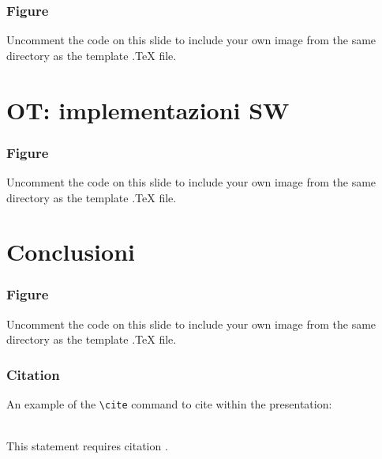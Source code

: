 \documentclass{beamer}
\begin{document}

\begin{frame}
	\frametitle{Figure}
	Uncomment the code on this slide to include your own image from the same directory as the template .TeX file.
\end{frame}

\section{OT: implementazioni SW}


\begin{frame}
	\frametitle{Figure}
	Uncomment the code on this slide to include your own image from the same directory as the template .TeX file.
\end{frame}



\section{Conclusioni}



\begin{frame}
	\frametitle{Figure}
	Uncomment the code on this slide to include your own image from the same directory as the template .TeX file.
\end{frame}















\begin{frame}[fragile] %
\frametitle{Citation}
An example of the \verb|\cite| command to cite within the presentation:\\~

This statement requires citation \cite{p1}.
\end{frame}
\end{document}
